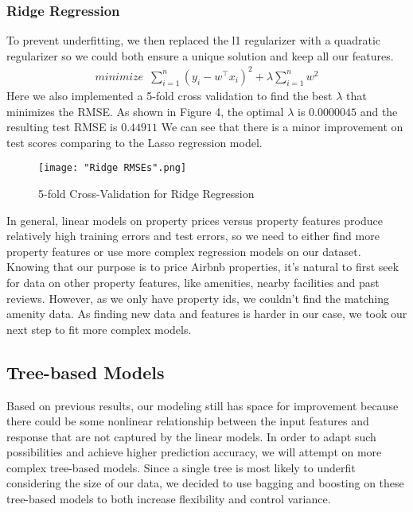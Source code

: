 \documentclass[twocolumn]{article}
\begin{document}
\subsubsection{Ridge Regression}
To prevent underfitting, we then replaced the l1 regularizer with a quadratic regularizer so we could both ensure a unique solution and keep all our features. 
\begin{align}  
    \displaystyle{minimize \enspace \sum\limits_{i=1}^{n}(y_i - w^\intercal x_i)^2 + \lambda \sum\limits_{i=1}^{n} w^2}
\end{align}
Here we also implemented a 5-fold cross validation to find the best $\lambda$ that minimizes the RMSE. As shown in Figure 4, the optimal $\lambda$ is $0.0000045$ and the resulting test RMSE is $0.44911$ We can see that there is a minor improvement on test scores comparing to the Lasso regression model. 

\begin{figure}[h]
    \centering
    \texttt{[image: "Ridge RMSEs".png]}
    \caption{5-fold Cross-Validation for Ridge Regression}
\end{figure}

In general, linear models on property prices versus property features produce relatively high training errors and test errors, so we need to either find more property features or use more complex regression models on our dataset. Knowing that our purpose is to price Airbnb properties, it's natural to first seek for data on other property features, like amenities, nearby facilities and past reviews. However, as we only have property ids, we couldn't find the matching amenity data. As finding new data and features is harder in our case, we took our next step to fit more complex models.

\subsection{Tree-based Models}

Based on previous results, our modeling still has space for improvement because there could be some nonlinear relationship between the input features and response that are not captured by the linear models. In order to adapt such possibilities and achieve higher prediction accuracy, we will attempt on more complex tree-based models. Since a single tree is most likely to underfit considering the size of our data, we decided to use bagging and boosting on these tree-based models to both increase flexibility and control variance.
\end{document}
